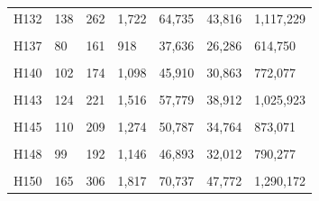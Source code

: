 \documentclass[
  a4paper,
  titlepage]{article}
\begin{document}
\begin{longtable}[t]{lllllll}
H132 & 138 & 262 & 1,722 & 64,735 & 43,816 & 1,117,229\\
 
\cellcolor{gray!6}{H135} & \cellcolor{gray!6}{101} & \cellcolor{gray!6}{191} & \cellcolor{gray!6}{1,122} & \cellcolor{gray!6}{46,504} & \cellcolor{gray!6}{31,420} & \cellcolor{gray!6}{810,470}\\
 
H137 & 80 & 161 & 918 & 37,636 & 26,286 & 614,750\\
 
\cellcolor{gray!6}{H138} & \cellcolor{gray!6}{105} & \cellcolor{gray!6}{200} & \cellcolor{gray!6}{1,227} & \cellcolor{gray!6}{48,869} & \cellcolor{gray!6}{33,447} & \cellcolor{gray!6}{913,790}\\
 
H140 & 102 & 174 & 1,098 & 45,910 & 30,863 & 772,077\\
 
\cellcolor{gray!6}{H142} & \cellcolor{gray!6}{117} & \cellcolor{gray!6}{185} & \cellcolor{gray!6}{1,108} & \cellcolor{gray!6}{45,289} & \cellcolor{gray!6}{30,458} & \cellcolor{gray!6}{729,062}\\
 
H143 & 124 & 221 & 1,516 & 57,779 & 38,912 & 1,025,923\\
 
\cellcolor{gray!6}{H144} & \cellcolor{gray!6}{135} & \cellcolor{gray!6}{226} & \cellcolor{gray!6}{1,442} & \cellcolor{gray!6}{56,867} & \cellcolor{gray!6}{38,501} & \cellcolor{gray!6}{1,016,544}\\
 
H145 & 110 & 209 & 1,274 & 50,787 & 34,764 & 873,071\\
 
\cellcolor{gray!6}{H146} & \cellcolor{gray!6}{92} & \cellcolor{gray!6}{208} & \cellcolor{gray!6}{1,295} & \cellcolor{gray!6}{49,304} & \cellcolor{gray!6}{33,035} & \cellcolor{gray!6}{842,436}\\
 
H148 & 99 & 192 & 1,146 & 46,893 & 32,012 & 790,277\\
 
\cellcolor{gray!6}{H149} & \cellcolor{gray!6}{84} & \cellcolor{gray!6}{169} & \cellcolor{gray!6}{1,109} & \cellcolor{gray!6}{45,354} & \cellcolor{gray!6}{30,743} & \cellcolor{gray!6}{778,565}\\
 
H150 & 165 & 306 & 1,817 & 70,737 & 47,772 & 1,290,172\\
 

\end{longtable}
\end{document}
